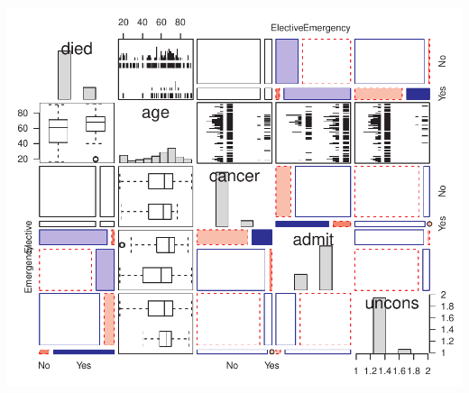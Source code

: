 \documentclass[10pt]{report}\usepackage[]{graphicx}\usepackage[]{color}
\newenvironment{knitrout}{}{} %
\renewenvironment{knitrout}{\small\renewcommand{\baselinestretch}{.85}}{} %
\begin{document}
\begin{Exercises}
\begin{ans}
\begin{knitrout}
\centerline{\includegraphics[width=.75\textwidth]{soln/fig/ex7_4a-1} }



\end{knitrout}
	\end{ans}




\end{Exercises}
\end{document}
